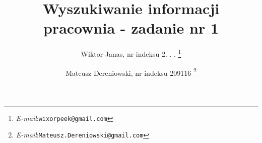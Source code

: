 \documentclass[a4paper]{article}
\begin{document}
\title{Wyszukiwanie informacji \\ pracownia - zadanie nr 1}
\author{Wiktor Janas, nr indeksu 2. . .
	\thanks{\textit{E-mail}:\texttt{wixorpeek@gmail.com}}
\and Mateusz Dereniowski, nr indeksu 209116
\thanks{\textit{E-mail}:\texttt{Mateusz.Dereniowski@gmail.com}}}

\begin{titlepage}
\maketitle
\thispagestyle{empty}
\end{titlepage}

\tableofcontents
\newpage

\section{}
\end{document}
